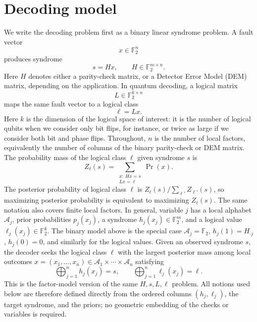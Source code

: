 \documentclass[a4paper,twocolumn,11pt,unpublished]{quantumarticle}
\newcommand{\A}{\mathcal{A}}
\newcommand{\GF}{\mathbb{F}_2}
\begin{document}
\section{Decoding model}
\label{sec:model}

We write the decoding problem first as a binary linear syndrome problem.  A fault vector
\begin{equation}
    x\in\GF^n
\end{equation}
produces syndrome
\begin{equation}
    s = Hx,
    \qquad
    H\in\GF^{m\times n}.
\end{equation}
Here \(H\) denotes either a parity-check matrix, or a Detector Error Model (DEM) matrix, depending on the application.  In quantum decoding, a logical matrix
\begin{equation}
    L\in\GF^{k\times n}
\end{equation}
maps the same fault vector to a logical class
\begin{equation}
    \ell = Lx.
\end{equation}
Here $k$ is the dimension of the logical space of interest: it is the number of logical qubits when we consider only bit flips, for instance, or twice as large if we consider both bit and phase flips.
Throughout, \(n\) is the number of local factors, equivalently the number of columns of the binary parity-check or DEM matrix.
The probability mass of the logical class \(\ell\) given syndrome $s$  is
\begin{equation}
    Z_\ell(s)=
    \sum_{\substack{x:\ Hx=s\\ Lx=\ell}}
    \Pr(x).
    \label{eq:coset_partition}
\end{equation}
The posterior probability of logical class \(\ell\) is
\(Z_\ell(s)/\sum_{\ell'} Z_{\ell'}(s)\), so maximizing posterior probability is
equivalent to maximizing \(Z_\ell(s)\).
The same notation also covers finite local factors.  In general, variable \(j\) has a local alphabet \(\A_j\), prior probabilities \(p_j(x_j)\), a syndrome \(h_j(x_j)\in\GF^m\), and a logical value \(\ell_j(x_j)\in\GF^k\).  The binary model above is the special case \(\A_j=\GF\), \(h_j(1)=H_{\cdot j}\), \(h_j(0)=0\), and similarly for the logical values.  Given an observed syndrome \(s\), the decoder seeks the logical class \(\ell\) with the largest posterior mass among local outcomes \(x=(x_1,\ldots,x_n)\in\A_1\times\cdots\times\A_n\) satisfying
\begin{equation}
    \bigoplus_{j=1}^n h_j(x_j)=s,
    \qquad
    \bigoplus_{j=1}^n \ell_j(x_j)=\ell .
\end{equation}
This is the factor-model version of the same \(H,s,L,\ell\) problem.
All notions used below are therefore defined directly from the ordered columns \((h_j,\ell_j)\), the target syndrome, and the priors; no geometric embedding of the checks or variables is required.
\end{document}
